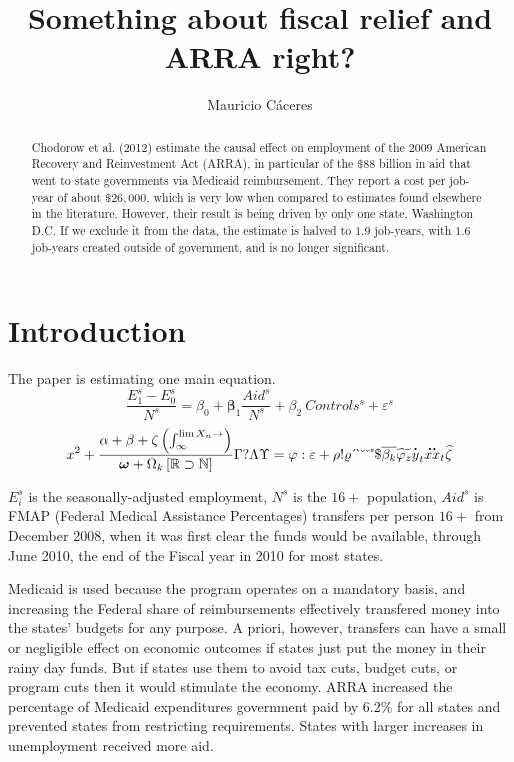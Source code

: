 \documentclass[12pt]{article}
\title{Something about fiscal relief and ARRA right?}
\author{Mauricio C\'aceres}
\begin{document}
\displayoptions

\begin{abstract}
  \noindent Chodorow et al. (2012) estimate the causal effect on employment of the 2009 American Recovery and Reinvestment Act (ARRA), in particular of the $\$88$ billion in aid that went to state governments via Medicaid reimbursement. They report a cost per job-year of about $\$26,000$, which is very low when compared to estimates found elsewhere in the literature. However, their result is being driven by only one state, Washington D.C. If we exclude it from the data, the estimate is halved to $1.9$ job-years, with $1.6$ job-years created outside of government, and is no longer significant.
\end{abstract}

\section{Introduction}
\label{sec:introduction}

The paper is estimating one main equation.
\begin{equation}
  \dfrac{E_1^s - E_0^s}{N^s}
  = \beta_0 + \boldsymbol\beta_1 \dfrac{Aid^s}{N^s} + \beta_2 ~ Controls^s + \varepsilon^s
\end{equation}
\[
  x^2 + \dfrac{\alpha + \beta + \zeta \left(\int_{\infty}^{\lim X_n \to \empty}\right)}{\bm \omega + \Omega_k \left[\mathbb{R} \supset \mathbb{N}\right]}
  \Gamma ? \Lambda\Upsilon = \varphi : \varepsilon + \rho ! \varrho
\acute ~ \grave ~ \breve ~ \check ~ \mathring ~ \mathdollar
\overline{\beta_k} \widetilde{\varphi_z} \dot{y}_t \ddot{xx}_t \widehat{\zeta}
\]

$E_i^s$ is the seasonally-adjusted employment, $N^s$ is the $16+$ population, $Aid^s$ is FMAP (Federal Medical Assistance Percentages) transfers per person $16+$ from December 2008, when it was first clear the funds would be available, through June 2010, the end of the Fiscal year in 2010 for most states.

Medicaid is used because the program operates on a mandatory basis, and increasing the Federal share of reimbursements effectively transfered money into the states' budgets for any purpose. A priori, however, transfers can have a small or negligible effect on economic outcomes if states just put the money in their rainy day funds. But if states use them to avoid tax cuts, budget cuts, or program cuts then it would stimulate the economy. ARRA increased the percentage of Medicaid expenditures government paid by 6.2\% for all states and prevented states from restricting requirements. States with larger increases in unemployment received more aid.
\end{document}
